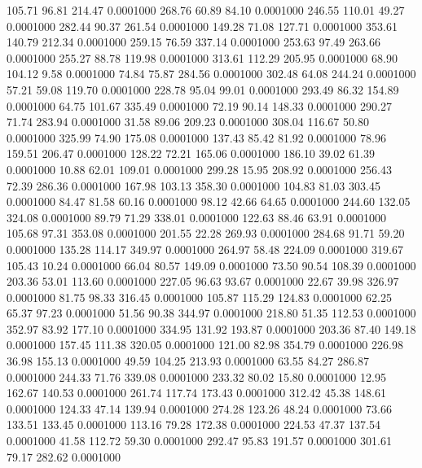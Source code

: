  105.71   96.81  214.47   0.0001000
 268.76   60.89   84.10   0.0001000
 246.55  110.01   49.27   0.0001000
 282.44   90.37  261.54   0.0001000
 149.28   71.08  127.71   0.0001000
 353.61  140.79  212.34   0.0001000
 259.15   76.59  337.14   0.0001000
 253.63   97.49  263.66   0.0001000
 255.27   88.78  119.98   0.0001000
 313.61  112.29  205.95   0.0001000
  68.90  104.12    9.58   0.0001000
  74.84   75.87  284.56   0.0001000
 302.48   64.08  244.24   0.0001000
  57.21   59.08  119.70   0.0001000
 228.78   95.04   99.01   0.0001000
 293.49   86.32  154.89   0.0001000
  64.75  101.67  335.49   0.0001000
  72.19   90.14  148.33   0.0001000
 290.27   71.74  283.94   0.0001000
  31.58   89.06  209.23   0.0001000
 308.04  116.67   50.80   0.0001000
 325.99   74.90  175.08   0.0001000
 137.43   85.42   81.92   0.0001000
  78.96  159.51  206.47   0.0001000
 128.22   72.21  165.06   0.0001000
 186.10   39.02   61.39   0.0001000
  10.88   62.01  109.01   0.0001000
 299.28   15.95  208.92   0.0001000
 256.43   72.39  286.36   0.0001000
 167.98  103.13  358.30   0.0001000
 104.83   81.03  303.45   0.0001000
  84.47   81.58   60.16   0.0001000
  98.12   42.66   64.65   0.0001000
 244.60  132.05  324.08   0.0001000
  89.79   71.29  338.01   0.0001000
 122.63   88.46   63.91   0.0001000
 105.68   97.31  353.08   0.0001000
 201.55   22.28  269.93   0.0001000
 284.68   91.71   59.20   0.0001000
 135.28  114.17  349.97   0.0001000
 264.97   58.48  224.09   0.0001000
 319.67  105.43   10.24   0.0001000
  66.04   80.57  149.09   0.0001000
  73.50   90.54  108.39   0.0001000
 203.36   53.01  113.60   0.0001000
 227.05   96.63   93.67   0.0001000
  22.67   39.98  326.97   0.0001000
  81.75   98.33  316.45   0.0001000
 105.87  115.29  124.83   0.0001000
  62.25   65.37   97.23   0.0001000
  51.56   90.38  344.97   0.0001000
 218.80   51.35  112.53   0.0001000
 352.97   83.92  177.10   0.0001000
 334.95  131.92  193.87   0.0001000
 203.36   87.40  149.18   0.0001000
 157.45  111.38  320.05   0.0001000
 121.00   82.98  354.79   0.0001000
 226.98   36.98  155.13   0.0001000
  49.59  104.25  213.93   0.0001000
  63.55   84.27  286.87   0.0001000
 244.33   71.76  339.08   0.0001000
 233.32   80.02   15.80   0.0001000
  12.95  162.67  140.53   0.0001000
 261.74  117.74  173.43   0.0001000
 312.42   45.38  148.61   0.0001000
 124.33   47.14  139.94   0.0001000
 274.28  123.26   48.24   0.0001000
  73.66  133.51  133.45   0.0001000
 113.16   79.28  172.38   0.0001000
 224.53   47.37  137.54   0.0001000
  41.58  112.72   59.30   0.0001000
 292.47   95.83  191.57   0.0001000
 301.61   79.17  282.62   0.0001000
